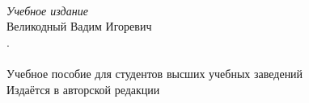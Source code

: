 \newpage
\thispagestyle{empty}
~\vfill
\begin{centering}
  \textit{Учебное издание}\\[18pt]
  Великодный Вадим Игоревич\\[6pt]
  \textsc{\Title. \SubTitle}\\[6pt]
  \PubType\\[18pt]
  Учебное пособие для студентов высших учебных заведений\\[18pt]
  Издаётся в авторской редакции\\
\end{centering}
\vspace{3cm}
